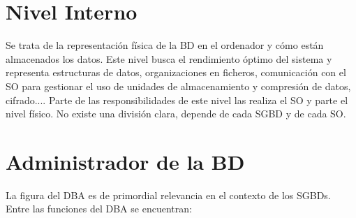 \documentclass[a4paper,11pt]{article}
\begin{document}
\section{Nivel Interno}
Se trata de la representación física de la BD en el ordenador y cómo están almacenados los datos. Este nivel busca el rendimiento óptimo del sistema y representa estructuras de datos, organizaciones en ficheros, comunicación con el SO para gestionar el uso de unidades de almacenamiento y compresión de datos, cifrado.... Parte de las responsibilidades de este nivel las realiza el SO y parte el nivel físico. No existe una división clara, depende de cada SGBD y de cada SO.

\section{Administrador de la BD}
La figura del DBA es de primordial relevancia en el contexto de los SGBDs. Entre las funciones del DBA se encuentran:
\end{document}
